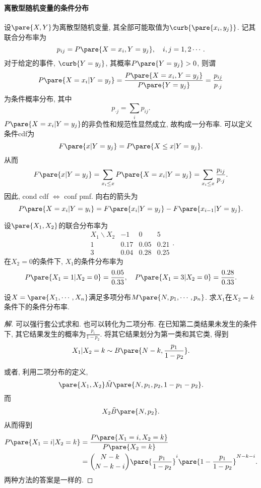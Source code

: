 \documentclass[../Statistics.tex]{subfiles}
\begin{document}
\paragraph{离散型随机变量的条件分布} %
\label{par:离散型随机变量的条件分布}

设$\pare{X,Y}$为离散型随机变量, 其全部可能取值为$\curb{\pare{x_i, y_j}}$. 记其联合分布率为
\[ p_{ij} = P\pare{X=x_i,Y=y_j}, \quad i,j = 1,2\cdots. \]
对于给定的事件, $\curb{Y=y_j}$, 其概率$P\pare{Y=y_j}>0$, 则谓
\[ P\pare{X=x_i\vert Y = y_j} = \frac{P\pare{X=x_i,Y=y_j}}{P\pare{Y=y_j}} = \frac{p_{ij}}{p_{\cdot j}} \]
为条件概率分布, 其中
\[ p_{\cdot j} = \sum_i p_{ij}. \]
$P\pare{X=x_i\vert Y = y_j}$的非负性和规范性显然成立, 故构成一分布率. 可以定义条件cdf为
\[ F\pare{x\vert Y = y_j} = P\pare{X\le x\vert Y = y_j}. \]
从而
\[ F\pare{x\vert Y = y_j} = \sum_{x_i\le x} P\pare{X=x_i \vert Y = y_j} = \sum_{x_i \le x} \frac{p_{ij}}{p_{\cdot j}}. \]
因此, cond cdf $\Leftrightarrow$ conf pmf. 向右的箭头为
\[ P\pare{X=x_i\vert Y = y_i} = F\pare{x_i\vert Y=y_j} - F\pare{x_{i-1}\vert Y = y_j}. \]
\begin{sample}
    \begin{ex}
        设$\pare{X_1,X_2}$的联合分布率为
        \[ \begin{array}{cccc}
            X_1\backslash X_2 & -1 & 0 & 5 \\
            1 & 0.17 & 0.05 & 0.21 \\
            3 & 0.04 & 0.28 & 0.25
        \end{array}. \]
        在$X_2=0$的条件下, $X_1$的条件分布率为
        \[ P\pare{X_1 = 1\vert X_2 = 0} = \frac{0.05}{0.33}, \quad P\pare{X_1 = 3\vert X_2 = 0} = \frac{0.28}{0.33}. \]
    \end{ex}
\end{sample}
\begin{sample}
    \begin{ex}
        设$X = \pare{X_1, \cdots, X_n}$满足多项分布$M\pare{N,p_1,\cdots,p_n}$. 求$X_1$在$X_2 = k$条件下的条件分布率.
    \end{ex}
    \begin{proof}[解]
        可以强行套公式求和. 也可以转化为二项分布. 在已知第二类结果未发生的条件下, 其它结果发生的概率为$\displaystyle \frac{p_i}{1-p_2}$. 将其它结果划分为第一类和其它类, 得到
        \[ X_1 \vert X_2 = k \sim B\pare{N-k, \frac{p_1}{1-p_2}}. \]
        \par
        或者, 利用二项分布的定义,
        \[ \pare{X_1,X_2} \tilde M\pare{N, p_1, p_2, 1-p_1-p_2}. \]
        而
        \[ X_2 \tilde B\pare{N, p_2}. \]
        从而得到
        \begin{align*}
            P\pare{X_1 = i\vert X_2 = k} &= \frac{P\pare{X_1 = i,X_2 = k}}{P\pare{X_2 = k}} \\ &= \binom{N-k}{N-k-i}\pare{\frac{p_1}{1-p_2}}^i\pare{1-\frac{p_1}{1-p_2}}^{N-k-i}. 
        \end{align*}
        两种方法的答案是一样的.
    \end{proof}
\end{sample}
\end{document}
